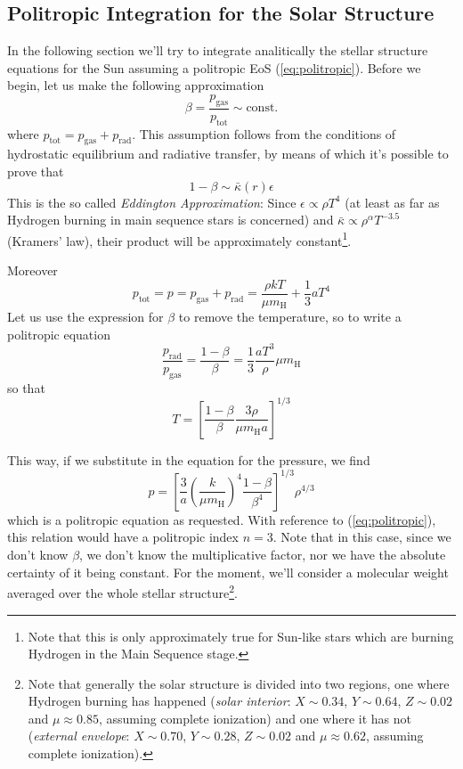 \subsection*{Politropic Integration for the Solar Structure}

In the following section we'll try to integrate analitically the stellar structure equations for the Sun assuming a politropic EoS (\ref{eq:politropic}). Before we begin, let us make the following approximation
\begin{equation*}
	\beta = \frac{p_{\text{gas}}}{p_{\text{tot}}} \sim \text{const.}
\end{equation*}
where $p_{\text{tot}} = p_{\text{gas}}+p_{\text{rad}}$. This assumption follows from the conditions of hydrostatic equilibrium and radiative transfer, by means of which it's possible to prove that 
\begin{equation*}
	1-\beta \sim \bar{\kappa}(r)\epsilon
\end{equation*}
This is the so called \emph{Eddington Approximation}: Since $\epsilon \propto \rho T^{4}$ (at least as far as Hydrogen burning in main sequence stars is concerned) and $\bar{\kappa}\propto \rho^{\alpha}T^{-3.5}$ (Kramers' law), their product will be approximately constant\footnote{Note that this is only approximately true for Sun-like stars which are burning Hydrogen in the Main Sequence stage.}. 
\par Moreover
\begin{equation*}
	p_{\text{tot}} = p = p_{\text{gas}}+p_{\text{rad}} = \frac{\rho kT}{\mu m_{\text{H}}} + \frac{1}{3}aT^{4}
\end{equation*}
Let us use the expression for $\beta$ to remove the temperature, so to write a politropic equation
\begin{equation*}
	\frac{p_{\text{rad}}}{p_{\text{gas}}} = \frac{1-\beta}{\beta} = \frac{1}{3}\frac{aT^{3}}{\rho}\mu m_{\text{H}}
\end{equation*}
so that
\begin{equation*}
	T = \left[\frac{1-\beta}{\beta}\frac{3\rho}{\mu m_{\text{H}}a}\right]^{1/3}
\end{equation*}
\par This way, if we substitute in the equation for the pressure, we find
\begin{equation}
	p = \left[\frac{3}{a}\left(\frac{k}{\mu m_{\text{H}}}\right)^{4}\frac{1-\beta}{\beta^{4}}\right]^{1/3}\rho^{4/3}
	\label{eq:solar_politropicequation}
\end{equation}
which is a politropic equation as requested. With reference to (\ref{eq:politropic}), this relation would have a politropic index $n=3$. Note that in this case, since we don't know $\beta$, we don't know the multiplicative factor, nor we have the absolute certainty of it being constant. For the moment, we'll consider a molecular weight averaged over the whole stellar structure\footnote{Note that generally the solar structure is divided into two regions, one where Hydrogen burning has happened (\emph{solar interior}: $X \sim 0.34$, $Y\sim 0.64$, $Z \sim 0.02$ and $\mu \approx 0.85$, assuming complete ionization) and one where it has not (\emph{external envelope}: $X \sim 0.70$, $Y\sim 0.28$, $Z \sim 0.02$ and $\mu \approx 0.62$, assuming complete ionization).}.
